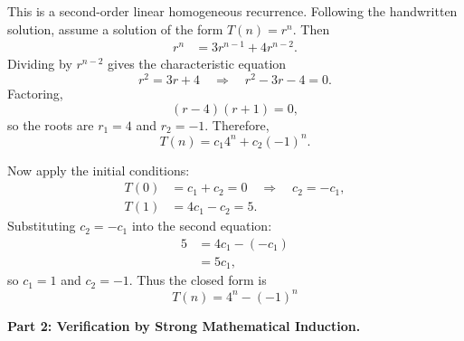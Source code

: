 \documentclass[12pt,a4paper]{article}
\begin{document}
This is a second-order linear homogeneous recurrence. Following the handwritten solution, assume a solution of the form $T(n)=r^n$. Then
\begin{align*}
r^n &= 3r^{n-1}+4r^{n-2}.
\end{align*}
Dividing by $r^{n-2}$ gives the characteristic equation
\begin{equation*}
r^2=3r+4
\quad \Longrightarrow \quad
r^2-3r-4=0.
\end{equation*}
Factoring,
\begin{equation*}
(r-4)(r+1)=0,
\end{equation*}
so the roots are $r_1=4$ and $r_2=-1$. Therefore,
\begin{equation*}
T(n)=c_1 4^n+c_2(-1)^n.
\end{equation*}

Now apply the initial conditions:
\begin{align*}
T(0) &= c_1+c_2=0
\quad \Longrightarrow \quad
c_2=-c_1, \\
T(1) &= 4c_1-c_2=5.
\end{align*}
Substituting $c_2=-c_1$ into the second equation:
\begin{align*}
5 &= 4c_1-(-c_1) \\
&=5c_1,
\end{align*}
so $c_1=1$ and $c_2=-1$. Thus the closed form is
\begin{equation*}
T(n) = 4^n - (-1)^n
\end{equation*}

\textbf{Part 2: Verification by Strong Mathematical Induction.}
\end{document}
